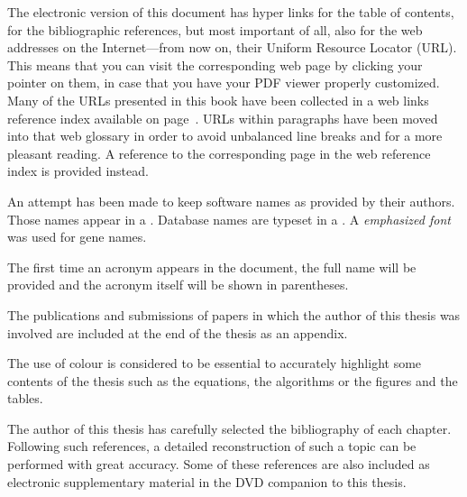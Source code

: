 \begin{mitemize}
\item
The electronic version of this document has hyper links for the table
of contents, for the bibliographic references, but most important of all, 
also for the web addresses on the Internet---from now on, their Uniform Resource 
Locator (URL).
This means that you can visit the corresponding web page by clicking
your pointer on them, in case that you have your PDF viewer properly
customized. Many of the URLs presented in this book have been
collected in a web links reference index available on
page~\pageref{sec:webrefs}. URLs within paragraphs have been moved
into that web glossary in order to avoid unbalanced line breaks and
for a more pleasant reading. A reference to the corresponding page in
the web reference index is provided instead. 
\item
An attempt has been made to keep software names as provided by their
authors. Those names appear in a \prog{\progfont}. Database names are
typeset in a \db{\dbfont}. A \emph{emphasized font} was used for gene
names.
\item
The first time an acronym appears in the document, the full name will
be provided and the acronym itself will be shown in parentheses. 
\item
The publications and submissions of papers in which the author of this thesis 
was involved are included at the end of the thesis as an appendix.
\item
The use of colour is considered to be essential to accurately highlight
some contents of the thesis such as the equations, the algorithms or the
figures and the tables. 
\item
The author of this thesis has carefully selected the bibliography of each
chapter. Following such references, a detailed reconstruction of such a
topic can be performed with great accuracy. Some of these references are
also included as electronic supplementary material in the DVD companion 
to this thesis.
\end{mitemize}

%
